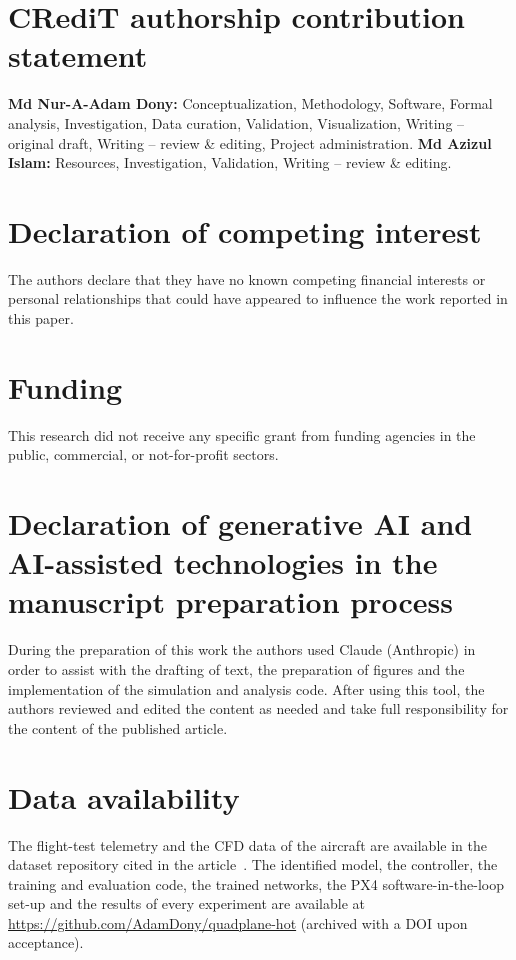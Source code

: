 \section*{CRediT authorship contribution statement}
\textbf{Md Nur-A-Adam Dony:} Conceptualization, Methodology, Software, Formal analysis, Investigation, Data curation, Validation, Visualization, Writing -- original draft, Writing -- review \& editing, Project administration. \textbf{Md Azizul Islam:} Resources, Investigation, Validation, Writing -- review \& editing.
\section*{Declaration of competing interest}
The authors declare that they have no known competing financial interests or personal relationships that could have appeared to influence the work reported in this paper.
\section*{Funding}
This research did not receive any specific grant from funding agencies in the public, commercial, or not-for-profit sectors.
\section*{Declaration of generative AI and AI-assisted technologies in the manuscript preparation process}
During the preparation of this work the authors used Claude (Anthropic) in order to assist with the drafting of text, the preparation of figures and the implementation of the simulation and analysis code. After using this tool, the authors reviewed and edited the content as needed and take full responsibility for the content of the published article.
\section*{Data availability}
The flight-test telemetry and the CFD data of the aircraft are available in the dataset repository cited in the article~\cite{Dony2026data}. The identified model, the controller, the training and evaluation code, the trained networks, the PX4 software-in-the-loop set-up and the results of every experiment are available at \url{https://github.com/AdamDony/quadplane-hot} (archived with a DOI upon acceptance).
